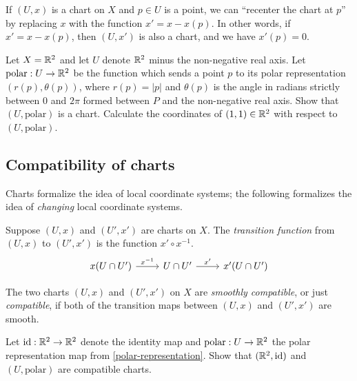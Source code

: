 \begin{remark} \label{recentering-chart}
	If $(U,x)$ is a chart on $X$ and $p \in U$  is a point, we can ``recenter the chart at $p$'' by replacing $x$ with the function $x' = x - x(p)$. In other words, if $x' = x - x(p)$, then $(U, x')$ is also a chart, and we have $x'(p) = 0$.
\end{remark}

\begin{exercise} \label{polar-representation}
	Let $X = \mathbb{R}^2$ and let $U$ denote $\mathbb{R}^2$ minus the non-negative real axis. Let $\text{polar} : U \to \mathbb{R}^2$ be the function which sends a point $p$ to its polar representation $(r(p), \theta(p))$, where $r(p) = |p|$ and $\theta(p)$ is the angle in radians strictly between 0 and $2\pi$ formed between $P$ and the non-negative real axis. Show that $(U, \text{polar})$ is a chart. Calculate the coordinates of $(1,1) \in \mathbb{R}^2$ with respect to $(U, \text{polar})$. 
\end{exercise}

\subsection{Compatibility of charts}

Charts formalize the idea of local coordinate systems; the following formalizes the idea of \emph{changing} local coordinate systems. 

\begin{definition} \label{transition-map} 
	Suppose $(U, x)$ and $(U', x')$ are charts on $X$. The \emph{transition function} from $(U, x)$ to $(U', x')$ is the function $x' \circ x^{-1}$. 
	\[ \begin{tikzcd}
	x(U \cap U') \ar{r}{x^{-1}} & U \cap U' \ar{r}{x'} & x'(U \cap U')
	\end{tikzcd} \]
\end{definition}

\begin{definition}  \label{compatibility}
	The two charts $(U, x)$ and $(U', x')$ on $X$ are \emph{smoothly compatible}, or just \emph{compatible}, if both of the transition maps between $(U, x)$ and $(U', x')$ are smooth. 
\end{definition}

\begin{exercise} \label{polar-compatible-with-identity}
	Let $\mathrm{id} : \mathbb{R}^2 \to \mathbb{R}^2$ denote the identity map and $\text{polar} : U \to \mathbb{R}^2$ the polar representation map from \cref{polar-representation}. Show that $(\mathbb{R}^2, \mathrm{id})$ and $(U, \text{polar})$ are compatible charts. 
\end{exercise}

